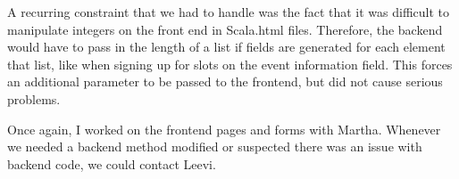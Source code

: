 \documentclass{article}
\begin{document}
A recurring constraint that we had to handle was the fact that it was difficult to manipulate integers on the front end in Scala.html files. Therefore, the backend would have to pass in the length of a list if fields are generated for each element that list, like when signing up for slots on the event information field. This forces an additional parameter to be passed to the frontend, but did not cause serious problems.

Once again, I worked on the frontend pages and forms with Martha. Whenever we needed a backend method modified or suspected there was an issue with backend code, we could contact Leevi.
\end{document}
